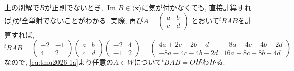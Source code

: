 \documentclass[titlepage]{jsarticle}
\numberwithin{equation}{section}
\renewcommand{\Im}{\operatorname{Im}}
\begin{document}
\begin{marker}
上の別解で$B$が正則でないとき, $\Im B \in \langle\bm{x}\rangle$に気が付かなくても, 直接計算すれば$f$が全単射でないことがわかる. 実際, 再び$A = 
\begin{pmatrix}
a & b\\
c & d
\end{pmatrix}$
とおいて${}^t\!BAB$を計算すれば,
\[
{}^tBAB = 
\begin{pmatrix}
-2 & -1 \\
4 & 2
\end{pmatrix}
\begin{pmatrix}
a & b\\
c & d
\end{pmatrix}
\begin{pmatrix}
-2 & 4\\
-1 & 2
\end{pmatrix}
=
\begin{pmatrix}
4a +  2c + 2b + d & -8a -4c -4b -2d\\
-8a -4c -4b -2d & 16a + 8c + 8b +4d
\end{pmatrix}
\]
なので, \eqref{eq:tmu2026-1a}より任意の$A \in W$について${}^t\!BAB = O$がわかる.
\end{marker}
\end{document}

